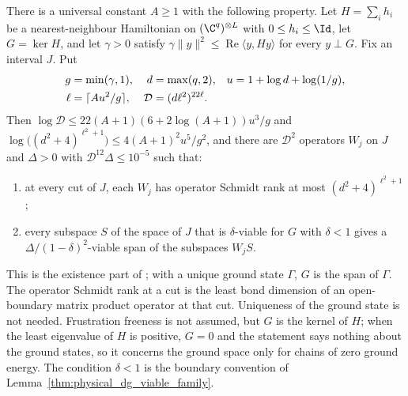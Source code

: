 \begin{theorem}
    \label{thm:alvv_ff_improving_family}
    \leanok
    There is a universal constant $A\ge1$ with the following property. Let
    $H=\sum_ih_i$ be a nearest-neighbour Hamiltonian on $(\C^q)^{\otimes L}$
    with $0\le h_i\le\Id$, let $G=\ker H$, and let $\gamma>0$ satisfy
    $\gamma\|y\|^2\le\operatorname{Re}\langle y,Hy\rangle$ for every
    $y\perp G$. Fix an interval $J$. Put
    \begin{align}
        g    & =\min(\gamma,1),      & d          & =\max(q,2),          & u & =1+\log d+\log(1/g),\notag \\
        \ell & =\lceil Au^2/g\rceil, & \mathcal D & =(d\ell^2)^{22\ell}.
        \label{eq:alvv_ff_family_parameters}
    \end{align}
    Then $\log\mathcal D\le22(A+1)(6+2\log(A+1))u^3/g$ and
    $\log\bigl((d^2+4)^{\ell^2+1}\bigr)\le4(A+1)^2u^5/g^2$, and there are
    $\mathcal D^2$ operators $W_j$ on $J$ and $\Delta>0$ with
    $\mathcal D^{12}\Delta\le10^{-5}$ such that:
    \begin{enumerate}
        \item at every cut of $J$, each $W_j$ has operator Schmidt rank at most
              $(d^2+4)^{\ell^2+1}$;
        \item every subspace $S$ of the space of $J$ that is $\delta$-viable for
              $G$ with $\delta<1$ gives a $\Delta/(1-\delta)^2$-viable span of the
              subspaces $W_jS$.
    \end{enumerate}
    This is the existence part of \cite[Theorem~5.15]{Arad2016RigorousRG};
    with a unique ground state $\Gamma$, $G$ is the span of $\Gamma$. The
    operator Schmidt rank at a cut is the least bond dimension of an
    open-boundary matrix product operator at that cut. Uniqueness of the ground
    state is not needed. Frustration freeness is not assumed, but $G$ is the
    kernel of $H$; when the least eigenvalue of $H$ is positive, $G=0$ and the
    statement says nothing about the ground states, so it concerns the ground
    space only for chains of zero ground energy. The condition $\delta<1$ is
    the boundary convention of Lemma~\ref{thm:physical_dg_viable_family}.
\end{theorem}

